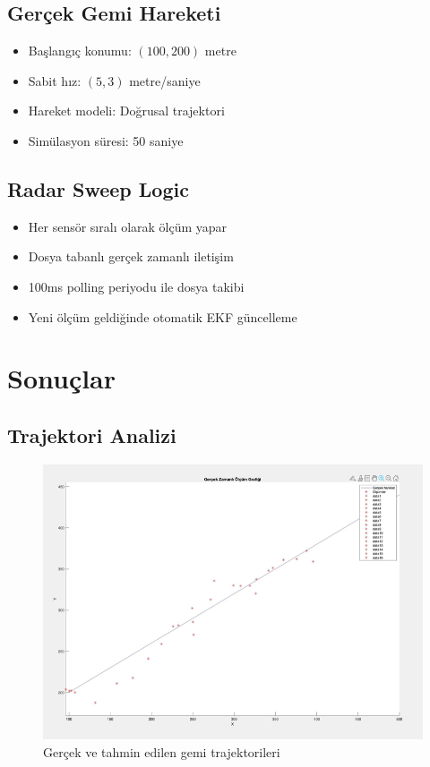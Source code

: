 \documentclass[11pt,a4paper]{article}
\begin{document}
\subsection{Gerçek Gemi Hareketi}
\begin{itemize}
    \item Başlangıç konumu: $(100, 200)$ metre
    \item Sabit hız: $(5, 3)$ metre/saniye
    \item Hareket modeli: Doğrusal trajektori
    \item Simülasyon süresi: 50 saniye
\end{itemize}

\subsection{Radar Sweep Logic}
\begin{itemize}
    \item Her sensör sıralı olarak ölçüm yapar
    \item Dosya tabanlı gerçek zamanlı iletişim
    \item 100ms polling periyodu ile dosya takibi
    \item Yeni ölçüm geldiğinde otomatik EKF güncelleme
\end{itemize}

\section{Sonuçlar}

\subsection{Trajektori Analizi}
\begin{figure}[H]
    \centering
    \includegraphics[width=12cm]{plot_small.png}
    \caption{Gerçek ve tahmin edilen gemi trajektorileri}
    \label{fig:trajectory}
\end{figure}
\end{document}
